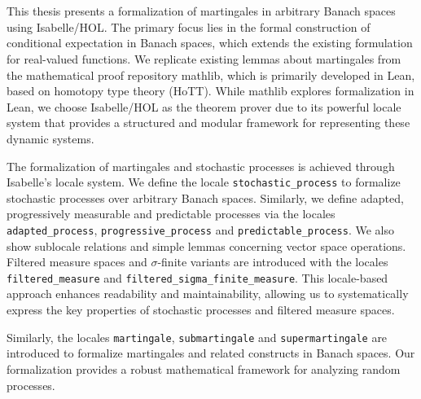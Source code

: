 ﻿\chapter{\abstractname}
This thesis presents a formalization of martingales in arbitrary Banach spaces using Isabelle/HOL. The primary focus lies in the formal construction of conditional expectation in Banach spaces, which extends the existing formulation for real-valued functions. We replicate existing lemmas about martingales from the mathematical proof repository mathlib, which is primarily developed in Lean, based on homotopy type theory (HoTT). While mathlib explores formalization in Lean, we choose Isabelle/HOL as the theorem prover due to its powerful locale system that provides a structured and modular framework for representing these dynamic systems.

The formalization of martingales and stochastic processes is achieved through Isabelle's locale system. We define the locale \lstinline{stochastic_process} to formalize stochastic processes over arbitrary Banach spaces. Similarly, we define adapted, progressively measurable and predictable processes via the locales \lstinline{adapted_process}, \lstinline{progressive_process} and \lstinline{predictable_process}. We also show sublocale relations and simple lemmas concerning vector space operations. Filtered measure spaces and $\sigma$-finite variants are introduced with the locales \lstinline{filtered_measure} and \lstinline{filtered_sigma_finite_measure}. This locale-based approach enhances readability and maintainability, allowing us to systematically express the key properties of stochastic processes and filtered measure spaces.

Similarly, the locales \lstinline{martingale}, \lstinline{submartingale} and \lstinline{supermartingale} are introduced to formalize martingales and related constructs in Banach spaces. Our formalization provides a robust mathematical framework for analyzing random processes.